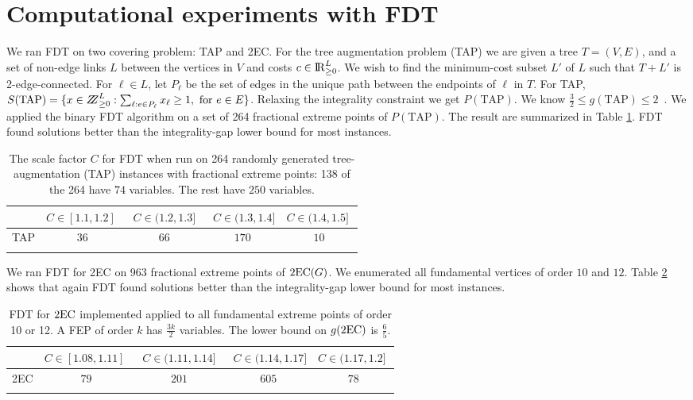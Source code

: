 \section{Computational experiments with FDT}\label{experiment}
We ran FDT on two covering problem: TAP and 2EC. For the tree augmentation problem (TAP) we are given a tree $T=(V,E)$, and a set of non-edge links $L$ between the vertices in $V$ and costs $c\in {\rm I\!R}^{L}_{\geq 0}$. We wish to find the minimum-cost subset $L'$ of $L$ such that $T+L'$ is 2-edge-connected. For $\ell\in L$, let $P_\ell$ be the set of edges in the unique path between the endpoints of $\ell$ in $T$. For TAP, $S(\mbox{TAP})=\{x\in \bbbz^{L}_{\geq 0}: \sum_{\ell: e\in P_\ell}x_\ell \geq 1, \mbox{ for $e\in E$}\}$. Relaxing the integrality constraint we get $P(\mbox{TAP})$. We know $\frac{3}{2}\leq g({\mbox{TAP}})\leq 2$~\cite{fj,32gap}. We applied the binary FDT algorithm on a set of 264 fractional extreme points of $P(\mbox{TAP})$. The result are summarized in Table \ref{tableTAP}. FDT found solutions better than the integrality-gap lower bound for most instances.
\begin{table}[h]
	\centering
	  \begin{tabular}{c c c c c}
	  \toprule
	  	& $C\in [1.1,1.2]\;$ & $\;C\in (1.2,1.3]\;$ &
               $\;C\in (1.3,1.4]$ &\; $C\in (1.4,1.5]\;$ \\ \midrule
	  	TAP & $36$ & $66$ & $170$ & $10$\\  \bottomrule \\
	  \end{tabular}\caption{The scale factor $C$ for FDT when run on 264 randomly generated tree-augmentation (TAP) instances with fractional extreme points: 138 of the 264 have $74$ variables. The rest have $250$ variables.}
	  \label{tableTAP}
\end{table}
We ran FDT for 2EC on 963 fractional extreme points of $\operatorname{2EC}(G)$. We enumerated all fundamental vertices of order $10$ and $12$. Table \ref{table2EC} shows that again FDT found solutions better than the integrality-gap lower bound for most instances. 
\begin{table}[h]
	\centering
	  \begin{tabular}{c c c c c}
	  	\toprule
	  	& $C\in [1.08,1.11]\;$ & $\;C\in (1.11,1.14]\;$ &
               $\;C\in (1.14,1.17]$ &\; $C\in (1.17,1.2]\;$ \\ \midrule
	  	2EC & $79$ & $201$ & $605$ & $78$ \\ \bottomrule\\
	  \end{tabular}	\caption{FDT for $\operatorname{2EC}$ implemented applied to all fundamental extreme points of order 10 or 12. A FEP of order $k$ has $\frac{3k}{2}$ variables. The lower bound on $g(\operatorname{2EC})$ is $\frac{6}{5}$.}
	  \label{table2EC}
\end{table}
